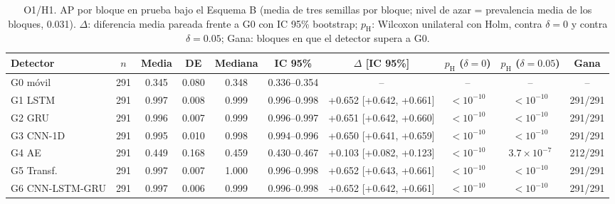 
\begin{table}[t]\centering\footnotesize\setlength{\tabcolsep}{4pt}
\caption{O1/H1. AP por bloque en prueba bajo el Esquema B (media de tres semillas por bloque; nivel de azar = prevalencia media de los bloques, 0.031). $\Delta$: diferencia media pareada frente a G0 con IC 95\% bootstrap; $p_{\mathrm{H}}$: Wilcoxon unilateral con Holm, contra $\delta=0$ y contra $\delta=0.05$; Gana: bloques en que el detector supera a G0.}
\label{tab:h1}
\begin{tabular}{@{}lccccccccc@{}}\toprule
Detector & $n$ & Media & DE & Mediana & IC 95\% & $\Delta$ [IC 95\%] & $p_{\mathrm{H}}$ ($\delta{=}0$) & $p_{\mathrm{H}}$ ($\delta{=}0.05$) & Gana \\\midrule
G0 m\'ovil & 291 & 0.345 & 0.080 & 0.348 & 0.336--0.354 & -- & -- & -- & -- \\
G1 LSTM & 291 & 0.997 & 0.008 & 0.999 & 0.996--0.998 & +0.652 [+0.642, +0.661] & $<\!10^{-10}$ & $<\!10^{-10}$ & 291/291 \\
G2 GRU & 291 & 0.996 & 0.007 & 0.999 & 0.996--0.997 & +0.651 [+0.642, +0.660] & $<\!10^{-10}$ & $<\!10^{-10}$ & 291/291 \\
G3 CNN-1D & 291 & 0.995 & 0.010 & 0.998 & 0.994--0.996 & +0.650 [+0.641, +0.659] & $<\!10^{-10}$ & $<\!10^{-10}$ & 291/291 \\
G4 AE & 291 & 0.449 & 0.168 & 0.459 & 0.430--0.467 & +0.103 [+0.082, +0.123] & $<\!10^{-10}$ & $3.7\!\times\!10^{-7}$ & 212/291 \\
G5 Transf. & 291 & 0.997 & 0.007 & 1.000 & 0.996--0.998 & +0.652 [+0.643, +0.661] & $<\!10^{-10}$ & $<\!10^{-10}$ & 291/291 \\
G6 CNN-LSTM-GRU & 291 & 0.997 & 0.006 & 0.999 & 0.996--0.998 & +0.652 [+0.642, +0.661] & $<\!10^{-10}$ & $<\!10^{-10}$ & 291/291 \\
\bottomrule\end{tabular}\end{table}

